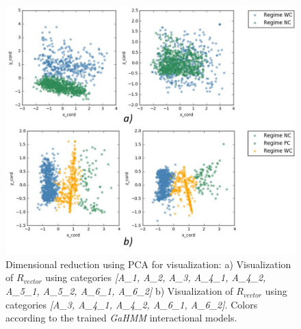 \begin{figure}[h!]
  \vspace{0.5em} %
  \includegraphics[scale=0.73]{Figures/Interactional_model_cluster.jpg}
  \caption{Dimensional reduction using PCA for visualization: a) Visualization of $R_{vector}$ using categories \textit{[A\_1, A\_2, A\_3, A\_4\_1, A\_4\_2, A\_5\_1, A\_5\_2, A\_6\_1, A\_6\_2]} b) Visualization of $R_{vector}$ using categories \textit{[A\_3, A\_{4\_1}, A\_{4\_2},  A\_{6\_1}, A\_{6\_2}]}. Colors according to the trained \textit{GaHMM} interactional models.}
  \label{fig:PCA_categories}
\end{figure}










